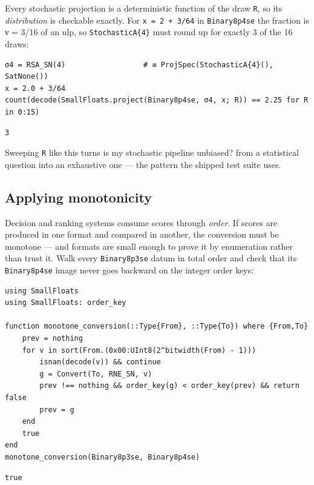 \label{14939961818204036216}{}


Every stochastic projection is a deterministic function of the draw \texttt{R}, so its \emph{distribution} is checkable exactly. For \texttt{x = 2 + 3/64} in \texttt{Binary8p4se} the fraction is ν = 3/16 of an ulp, so \texttt{StochasticA\{4\}} must round up for exactly 3 of the 16 draws:




\nopagebreak[4]
\begin{minipage}{\linewidth}
\begin{verbatim}
σ4 = RSA_SN(4)                  # ≡ ProjSpec(StochasticA{4}(), SatNone())
x = 2.0 + 3/64
count(decode(SmallFloats.project(Binary8p4se, σ4, x; R)) == 2.25 for R in 0:15)
\end{verbatim}




\begin{verbatim}
3
\end{verbatim}
\end{minipage}




Sweeping \texttt{R} like this turns {\textquotedbl}is my stochastic pipeline unbiased?{\textquotedbl} from a statistical question into an exhaustive one — the pattern the shipped test suite uses.



\subsection{Applying monotonicity}



\label{3081226660012937909}{}


Decision and ranking systems consume scores through \emph{order}. If scores are produced in one format and compared in another, the conversion must be monotone — and formats are small enough to prove it by enumeration rather than trust it. Walk every \texttt{Binary8p3se} datum in total order and check that its \texttt{Binary8p4se} image never goes backward on the integer order keys:




\nopagebreak[4]
\begin{minipage}{\linewidth}
\begin{verbatim}
using SmallFloats
using SmallFloats: order_key

function monotone_conversion(::Type{From}, ::Type{To}) where {From,To}
    prev = nothing
    for v in sort(From.(0x00:UInt8(2^bitwidth(From) - 1)))
        isnan(decode(v)) && continue
        g = Convert(To, RNE_SN, v)
        prev !== nothing && order_key(g) < order_key(prev) && return false
        prev = g
    end
    true
end
monotone_conversion(Binary8p3se, Binary8p4se)
\end{verbatim}




\begin{verbatim}
true
\end{verbatim}
\end{minipage}




